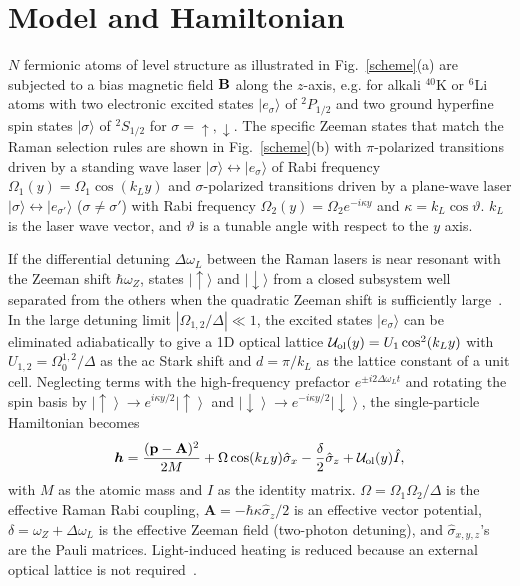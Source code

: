 \documentclass[twocolumn,prl,superscriptaddress,amsmath,amssymb]{revtex4} %
\begin{document}
\section{Model and Hamiltonian}\label{effham}
$N$ fermionic atoms of level structure as illustrated in Fig.~\ref{scheme}(a) are subjected to a bias magnetic field ${\bf B}$ along the $z$-axis, e.g. for alkali $^{40}$K or $^{6}$Li atoms with two electronic excited states $|e_{\sigma}\rangle$ of $^2P_{1/2}$ and two ground hyperfine spin states $|\sigma\rangle$ of $^2S_{1/2}$ for $\sigma=\uparrow,\downarrow$. The specific Zeeman states that match the Raman selection rules are shown in Fig.~\ref{scheme}(b) with $\pi$-polarized transitions driven by a standing wave laser $|\sigma\rangle\leftrightarrow |e_{\sigma}\rangle$ of Rabi frequency $\Omega_1(y)=\Omega_1\cos(k_Ly)$ and $\sigma$-polarized transitions driven by a plane-wave laser $|\sigma\rangle\leftrightarrow |e_{\sigma'}\rangle$ ($\sigma \neq\sigma'$) with Rabi frequency $\Omega_2(y) = \Omega_{2}e^{-i\kappa y}$ and $\kappa=k_L \cos{\vartheta}$. $k_L$ is the laser wave vector, and ${\vartheta}$ is a tunable angle with respect to the $y$ axis.

If the differential detuning $\Delta \omega_L$ between the Raman lasers is near resonant with the Zeeman shift $\hbar \omega_Z$, states $|\!\uparrow\rangle$ and $|\!\downarrow\rangle$ from a closed subsystem well separated from the others when the quadratic Zeeman shift is sufficiently large~\cite{Huang15}. In the large detuning limit $|\Omega_{1,2}/\Delta|\ll1$,
the excited states $|e_{\sigma}\rangle$ can be eliminated adiabatically to give a 1D optical lattice ${\cal U}_{\rm{ol}}(y)= U_1\cos^2(k_Ly)$ with $U_{1,2} = \Omega^{1,2}_0/\Delta$ as the ac Stark shift and $d = \pi/k_L$ as the lattice constant of a unit cell. Neglecting terms with the high-frequency prefactor $e^{\pm i2\Delta\omega_{L}t}$ and rotating the spin basis by $\left|\uparrow\right\rangle \rightarrow e^{i\kappa y/2}\left|\uparrow\right\rangle$ and $\left|\downarrow\right\rangle \rightarrow e^{-i\kappa y/2}\left|\downarrow\right\rangle$, the single-particle Hamiltonian becomes
\begin{eqnarray}
{\boldsymbol{h}}=\frac{({\mathbf{p}}-{\mathbf{A}})^{2}}{2M}+\Omega\cos(k_Ly) \hat{\sigma}_{x}-\frac{\delta}{2}\hat{\sigma}_{z}+{\cal U}_{\rm{ol}}(y)\hat{I},\label{single-SO}
\end{eqnarray}
with $M$ as the atomic mass and $\hat{I}$ as the identity matrix. $\Omega=\Omega_{1}\Omega_{2}/\Delta$ is the effective Raman Rabi coupling, ${\mathbf{A}}=-\hbar\kappa\hat{\sigma}_{z}/2$ is an effective vector potential, $\delta=\omega_Z+\Delta \omega_L$ is the effective Zeeman field (two-photon detuning), and $\hat{\sigma}_{x,y,z}$'s are the Pauli matrices. Light-induced heating is reduced because an external optical lattice is not required~\cite{Deng2016}.
\end{document}
